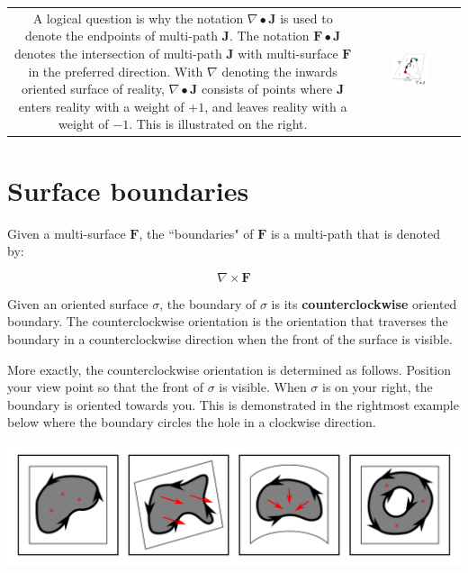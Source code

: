 \begin{tabular}{cc}
\parbox{0.5\textwidth}{
A logical question is why the notation \(\nabla \bullet \mathbf{J}\) is used to denote the endpoints of multi-path \(\mathbf{J}\). The notation \(\mathbf{F} \bullet \mathbf{J}\) denotes the intersection of multi-path \(\mathbf{J}\) with multi-surface \(\mathbf{F}\) in the preferred direction. With \(\nabla\) denoting the inwards oriented surface of reality, \(\nabla \bullet \mathbf{J}\) consists of points where \(\mathbf{J}\) enters reality with a weight of \(+1\), and leaves reality with a weight of \(-1\). This is illustrated on the right.
} & \parbox{0.4\textwidth}{
\includegraphics[width = 0.4\textwidth]{Boundaries/Path_endpoints/path_surface_intersections_and_path_endpoints}
}
\end{tabular}




\section{Surface boundaries}

Given a multi-surface \(\mathbf{F}\), the ``boundaries" of \(\mathbf{F}\) is a multi-path that is denoted by: 

\[\nabla \times \mathbf{F}\]

Given an oriented surface \(\sigma\), the boundary of \(\sigma\) is its {\bf counterclockwise} oriented boundary. The counterclockwise orientation is the orientation that traverses the boundary in a counterclockwise direction when the front of the surface is visible. 

More exactly, the counterclockwise orientation is determined as follows. Position your view point so that the front of \(\sigma\) is visible. When \(\sigma\) is on your right, the boundary is oriented towards you. This is demonstrated in the rightmost example below where the boundary circles the hole in a clockwise direction.

\begin{center}
\includegraphics[width = \textwidth]{Boundaries/Surface_boundaries/surface_boundary_examples}
\end{center}

